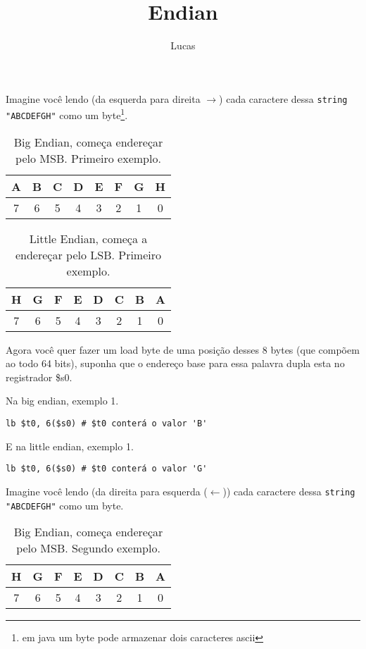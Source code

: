 \documentclass{article}
\author{Lucas}
\title{Endian}
\begin{document}
\maketitle

Imagine você lendo (da esquerda para direita $\rightarrow$) cada caractere dessa
\verb|string "ABCDEFGH"| como um byte\footnote{em java um byte pode armazenar
dois caracteres ascii}.

\begin{table}[ht!]
  \centering
  \begin{tabular}{|c|c|c|c|c|c|c|c|}
  \hline A & B & C & D & E & F & G & H \\
  \hline 7 & 6 & 5 & 4 & 3 & 2 & 1 & 0 \\
  \hline
  \end{tabular}
  \caption{Big Endian, começa endereçar pelo MSB. Primeiro exemplo.}
\end{table}

\begin{table}[ht!]
  \centering
  \begin{tabular}{|c|c|c|c|c|c|c|c|}
  \hline H & G & F & E & D & C & B & A \\
  \hline 7 & 6 & 5 & 4 & 3 & 2 & 1 & 0 \\
  \hline
  \end{tabular}
  \caption{Little Endian, começa a endereçar pelo LSB. Primeiro exemplo.}
\end{table}

Agora você quer fazer um load byte de uma posição desses 8 bytes (que compõem
ao todo 64 bits), suponha que o endereço base para essa palavra dupla esta no
registrador \$s0.

Na big endian, exemplo 1.

\begin{verbatim}
lb $t0, 6($s0) # $t0 conterá o valor 'B'
\end{verbatim}

E na little endian, exemplo 1.

\begin{verbatim}
lb $t0, 6($s0) # $t0 conterá o valor 'G'
\end{verbatim}

Imagine você lendo (da direita para esquerda ($\leftarrow$)) cada caractere
dessa \verb|string "ABCDEFGH"| como um byte.

\begin{table}[ht!]
  \centering
  \begin{tabular}{|c|c|c|c|c|c|c|c|}
  \hline H & G & F & E & D & C & B & A \\
  \hline 7 & 6 & 5 & 4 & 3 & 2 & 1 & 0 \\
  \hline
  \end{tabular}
  \caption{Big Endian, começa endereçar pelo MSB. Segundo exemplo.}
\end{table}
\end{document}
